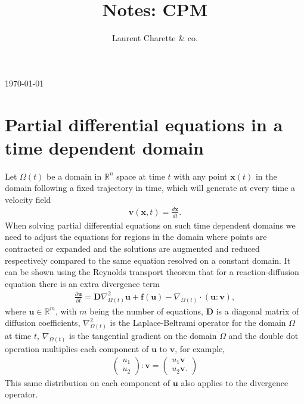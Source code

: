 \documentclass[fleqn,12pt]{siamart1116}
\begin{document}
\title{Notes: CPM}

\author{Laurent Charette \& co.}

\today






\section{Partial differential equations in a time dependent domain}

Let $\Omega(t)$ be a domain in $\mathbb{R}^n$ space at time $t$ with any point $\mathbf{x}(t)$ in the domain following a fixed trajectory in time, which will generate at every time a velocity field
\begin{align}
\mathbf{v}(\mathbf{x}, t) = \frac{d\mathbf{x}}{dt}.
\end{align}
When solving partial differential equations on such time dependent domains we need to adjust the equations for regions in the domain where points are contracted or expanded and the solutions are augmented and reduced respectively compared to the same equation resolved on a constant domain. It can be shown using the Reynolds transport theorem that for a reaction-diffusion equation there is an extra divergence term
\begin{align}
\frac{\partial \mathbf{u}}{\partial t} = \mathbf{D}\nabla^2_{\Omega(t)} \mathbf{u} + \mathbf{f}(\mathbf{u}) - \nabla_{\Omega(t)} \cdot (\mathbf{u} : \mathbf{v}),
\end{align}
where $\mathbf{u} \in \mathbb{R}^m$, with $m$ being the number of equations, $\mathbf{D}$ is a diagonal matrix of diffusion coefficients, $\nabla^2_{\Omega(t)}$ is the Laplace-Beltrami operator for the domain $\Omega$ at time $t$, $\nabla_{\Omega(t)}$ is the tangential gradient on the domain $\Omega$ and the double dot operation multiplies each component of $\mathbf{u}$ to $\mathbf{v}$, for example,
\begin{align}
\begin{pmatrix} u_1 \\ u_2 \end{pmatrix} : \mathbf{v} = \begin{pmatrix} u_1 \mathbf{v} \\ u_2 \mathbf{v}. \end{pmatrix}
\end{align}
This same distribution on each component of $\mathbf{u}$ also applies to the divergence operator.
\end{document}
